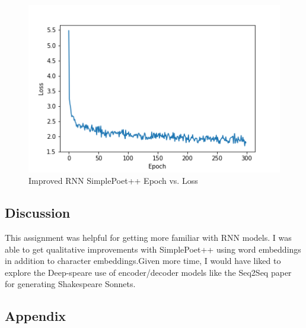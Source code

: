 \documentclass[a4paper,12pt]{article} %
\begin{document}
\begin{figure}
  \begin{center}
    \includegraphics[scale=0.5]{fancy_loss}
    \caption{Improved RNN SimplePoet++ Epoch vs. Loss}
    \end{center}
  \end{figure}


\subsection{Discussion}

This assignment was helpful for
getting more familiar with RNN models. I was able to get qualitative
improvements with SimplePoet++ using word embeddings in addition to
character embeddings.Given more time, I would have liked to explore the
Deep-speare
\cite{lau2018deepspeare}  use of encoder/decoder models like the Seq2Seq
paper for generating Shakespeare Sonnets.






\subsection{Appendix}
\end{document}
